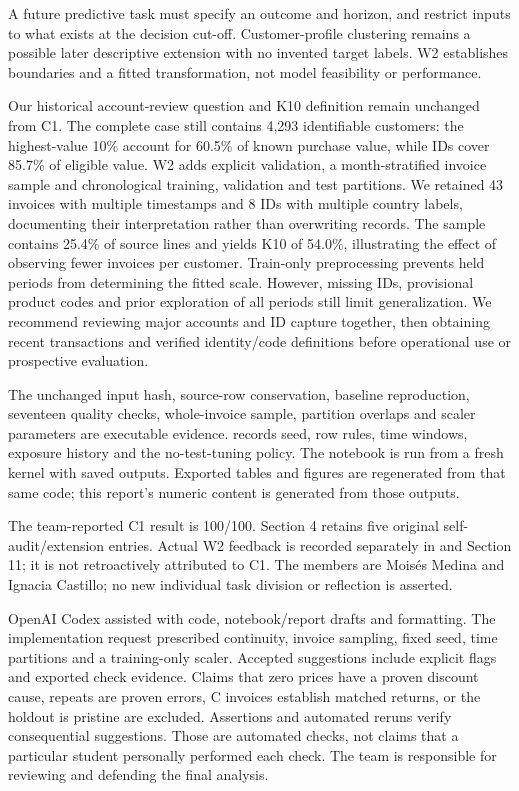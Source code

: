 \documentclass[10pt,a4paper]{article}
\newcommand{\sectionhead}[1]{\Needspace{8\baselineskip}\vspace{.4em}{\large\bfseries\color{navy}#1}\par\vspace{.1em}}
\newcommand{\subhead}[1]{\vspace{.2em}{\bfseries #1}\par}
\begin{document}
A future predictive task must specify an outcome and horizon, and restrict inputs to what exists at the decision cut-off. Customer-profile clustering remains a possible later descriptive extension with no invented target labels. W2 establishes boundaries and a fitted transformation, not model feasibility or performance.
\clearpage
\sectionhead{9\quad Management summary}

Our historical account-review question and K10 definition remain unchanged from C1. The complete case still contains 4,293 identifiable customers: the highest-value 10\% account for 60.5\% of known purchase value, while IDs cover 85.7\% of eligible value. W2 adds explicit validation, a month-stratified invoice sample and chronological training, validation and test partitions. We retained 43 invoices with multiple timestamps and 8 IDs with multiple country labels, documenting their interpretation rather than overwriting records. The sample contains 25.4\% of source lines and yields K10 of 54.0\%, illustrating the effect of observing fewer invoices per customer. Train-only preprocessing prevents held periods from determining the fitted scale. However, missing IDs, provisional product codes and prior exploration of all periods still limit generalization. We recommend reviewing major accounts and ID capture together, then obtaining recent transactions and verified identity/code definitions before operational use or prospective evaluation.

\sectionhead{10\quad Process record and rubric evidence}
\subhead{Decisions and checks}
The unchanged input hash, source-row conservation, baseline reproduction, seventeen quality checks, whole-invoice sample, partition overlaps and scaler parameters are executable evidence.  records seed, row rules, time windows, exposure history and the no-test-tuning policy. The notebook is run from a fresh kernel with saved outputs. Exported tables and figures are regenerated from that same code; this report's numeric content is generated from those outputs.

\subhead{Feedback and contributions}
The team-reported C1 result is 100/100. Section 4 retains five original self-audit/extension entries. Actual W2 feedback is recorded separately in  and Section 11; it is not retroactively attributed to C1. The members are Mois\'es Medina and Ignacia Castillo; no new individual task division or reflection is asserted.

\subhead{AI use and verification}
OpenAI Codex assisted with code, notebook/report drafts and formatting. The implementation request prescribed continuity, invoice sampling, fixed seed, time partitions and a training-only scaler. Accepted suggestions include explicit flags and exported check evidence. Claims that zero prices have a proven discount cause, repeats are proven errors, C invoices establish matched returns, or the holdout is pristine are excluded. Assertions and automated reruns verify consequential suggestions. Those are automated checks, not claims that a particular student personally performed each check. The team is responsible for reviewing and defending the final analysis.
\end{document}
